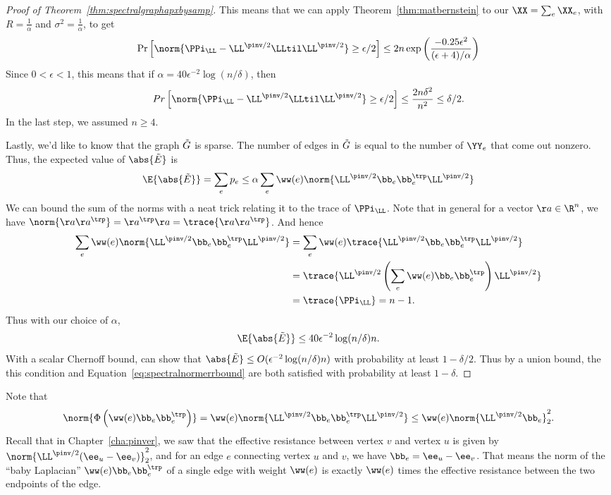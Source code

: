 \begin{proof}[Proof of Theorem~\ref{thm:spectralgraphapxbysamp}]
This means that we can apply Theorem~\ref{thm:matbernstein} to our
$\XX = \sum_e \XX_e$, with $R =  \frac{1}{\alpha}$ and $\sigma^2 =
\frac{1}{\alpha}$, to get
\[
  \Pr\left[\norm{\PPi_{\LL} - \LL^{\pinv/2}\LLtil\LL^{\pinv/2}}
  \geq  \epsilon/2\right]
  \leq 2n\exp\left(\frac{-0.25 \epsilon^2}{(\epsilon +
      4)/\alpha}\right)
\]
Since $0 < \epsilon < 1$, this means that if
$\alpha = 40 \epsilon^{-2}  \log(n/\delta)$,
then
\[
  Pr\left[\norm{\PPi_{\LL} - \LL^{\pinv/2}\LLtil\LL^{\pinv/2}}
    \geq  \epsilon/2\right]
\leq \frac{2n\delta^2}{n^2} \leq \delta/2.
\]
In the last step, we assumed $n \geq 4$.

Lastly, we'd like to know that the graph $\tilde{G}$ is sparse.
The number of edges in $\tilde{G}$ is equal to the number of $\YY_e$ that
come out nonzero.
Thus, the expected value of $\abs{\Etil}$ is
\[
  \E{\abs{\Etil}}
  =
  \sum_e p_e \leq \alpha \sum_e \ww(e) \norm{\LL^{\pinv/2}\bb_e\bb_e^{\trp}\LL^{\pinv/2}}
\]
We can bound the sum of the norms with a neat trick relating it to the
trace of $\PPi_{\LL}$.
Note that in general for a vector $\aa \in \R^n$, we have
$\norm{\aa\aa^{\trp}} = \aa^{\trp}\aa = \trace{\aa\aa^{\trp}}$.
And hence
\begin{align*}
  \sum_e
  \ww(e)
  \norm{\LL^{\pinv/2}\bb_e\bb_e^{\trp}\LL^{\pinv/2}}
  &=
  \sum_e
  \ww(e)
  \trace{\LL^{\pinv/2}\bb_e\bb_e^{\trp}\LL^{\pinv/2}}
  \\
  &=
  \trace{ \LL^{\pinv/2}  \left( \sum_e\ww(e) \bb_e\bb_e^{\trp}
    \right)\LL^{\pinv/2}}
  \\
  &= \trace{ \PPi_{\LL} } = n-1.
\end{align*}
Thus with our choice of $\alpha$,
\[
  \E{\abs{\Etil}} \leq 40 \epsilon^{-2}  \log(n/\delta) n.
\]
With a scalar Chernoff bound, can show that $\abs{\Etil} \leq O( \epsilon^{-2}  \log(n/\delta) n)$
with probability at least $1-\delta/2$.
Thus by a union bound, the this condition and
Equation~\eqref{eq:spectralnormerrbound} are both satisfied with
probability at least $1-\delta$.
\end{proof}

\begin{remark}
  Note that
  \[
    \norm{\Phi\left(\ww(e) \bb_e\bb_e^{\trp} \right)}
    =
    \ww(e)
   \norm{\LL^{\pinv/2}\bb_e\bb_e^{\trp}\LL^{\pinv/2}}
  \leq
  \ww(e)\norm{ \LL^{\pinv/2}\bb_e}_2^2.
  \]
  Recall that in Chapter~\ref{cha:pinver}, we saw that the effective resistance between vertex
  $v$ and vertex $u$ is given by
  $\norm{ \LL^{\pinv/2}(\ee_u - \ee_v)}_2^2$, and for an edge $e$
  connecting vertex $u$ and $v$, we have $\bb_{e}= \ee_u - \ee_v$.
 That means the norm of the ``baby Laplacian'' $\ww(e) \bb_e\bb_e^{\trp}$ of a single edge with weight
  $\ww(e)$ is exactly $\ww(e)$ times the effective resistance between
  the two endpoints of the edge.
\end{remark}

